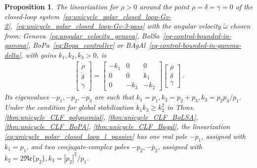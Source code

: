 \documentclass[journal,twoside,web]{ieeecolor}
\theoremstyle{definition}
\newtheorem{proposition}{Proposition}
\newcommand{\abs}[1]{\left\lvert#1\right\rvert}
\begin{document}
\begin{proposition}\em 
\label{prop:linearization_CLF_passivity_based}
The linearization for $\rho>0$ around the point $\rho =\delta = \gamma = 0$ of the closed-loop system~\eqref{eq:unicycle_polar_closed_loop-Gv-2},~\eqref{eq:unicycle_polar_closed_loop-Gv-3-pass} with the angular velocity \(\tilde{\omega}\) chosen from: Genova~\eqref{eq:angular_velocity_genova}, BolSa~\eqref{eq-control-bounded-in-gamma}, BoPa~\eqref{eq:Bopa_controller} or BAgAl~\eqref{eq-control-bounded-in-gamma-delta},
with gains $k_1, k_2, k_3 > 0$, is 
\begin{align}
\label{eq:unicycle_polar_closed_loop_l_passive}
\begin{bmatrix}
\dot{\rho}  \\
\dot{\delta} \\ 
\dot{\gamma} 
\end{bmatrix} = 
\begin{bmatrix}
-k_1 &0 &0 \\
0 &0 &k_1 \\
0 &-k_3 &-k_2
\end{bmatrix} \begin{bmatrix}
\rho \\ \delta \\ \gamma
\end{bmatrix}  \,.
\end{align}
Its eigenvalues 
$-p_1, -p_2,-p_3$ are such that
$k_1 = p_1 , 
k_2 = p_2 + p_3 ,
k_3  = {p_2 p_3}/{p_1}$.   
Under the condition for global stabilization $k_1 k_3 \ge k_2^2$ in Thms. \ref{thm:unicycle_CLF_polynomial},  \ref{thm:unicycle_CLF_BoLSA}, \ref{thm:unicycle_CLF_BoPA}, \ref{thm:unicycle_CLF_Bagal}, the linearization \eqref{eq:unicycle_polar_closed_loop_l_passive}
has one real pole $-p_1$, assigned with $k_1 = p_1$, 
and two conjugate-complex poles $-p_2, -\bar{p}_2$, assigned with $     k_2 = 2 \mathfrak{Re}\{p_2\}, 
k_3 = {\abs{p_2}^2}/{p_1}$.
\end{proposition}
\end{document}
